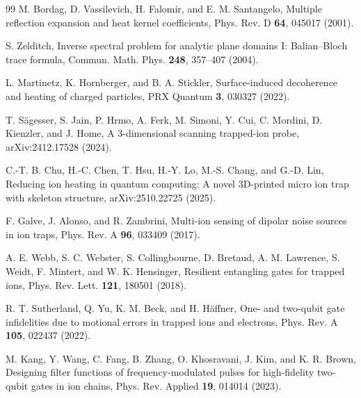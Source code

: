 \documentclass[aps,pra,twocolumn,superscriptaddress,longbibliography,nofootinbib,floatfix]{revtex4-2}
\theoremstyle{remark}
\begin{document}
\begin{thebibliography}{99}
M. Bordag, D. Vassilevich, H. Falomir, and E. M. Santangelo, Multiple reflection expansion and heat kernel coefficients, Phys. Rev. D \textbf{64}, 045017 (2001).

S. Zelditch, Inverse spectral problem for analytic plane domains I: Balian--Bloch trace formula, Commun. Math. Phys. \textbf{248}, 357--407 (2004).


L. Martinetz, K. Hornberger, and B. A. Stickler, Surface-induced decoherence and heating of charged particles, PRX Quantum \textbf{3}, 030327 (2022).

T. S\"agesser, S. Jain, P. Hrmo, A. Ferk, M. Simoni, Y. Cui, C. Mordini, D. Kienzler, and J. Home, A 3-dimensional scanning trapped-ion probe, arXiv:2412.17528 (2024).

C.-T. B. Chu, H.-C. Chen, T. Hsu, H.-Y. Lo, M.-S. Chang, and G.-D. Lin, Reducing ion heating in quantum computing: A novel 3D-printed micro ion trap with skeleton structure, arXiv:2510.22725 (2025).

F. Galve, J. Alonso, and R. Zambrini, Multi-ion sensing of dipolar noise sources in ion traps, Phys. Rev. A \textbf{96}, 033409 (2017).

A. E. Webb, S. C. Webster, S. Collingbourne, D. Bretaud, A. M. Lawrence, S. Weidt, F. Mintert, and W. K. Hensinger, Resilient entangling gates for trapped ions, Phys. Rev. Lett. \textbf{121}, 180501 (2018).

R. T. Sutherland, Q. Yu, K. M. Beck, and H. H\"affner, One- and two-qubit gate infidelities due to motional errors in trapped ions and electrons, Phys. Rev. A \textbf{105}, 022437 (2022).

M. Kang, Y. Wang, C. Fang, B. Zhang, O. Khosravani, J. Kim, and K. R. Brown, Designing filter functions of frequency-modulated pulses for high-fidelity two-qubit gates in ion chains, Phys. Rev. Applied \textbf{19}, 014014 (2023).

\end{thebibliography}
\end{document}

